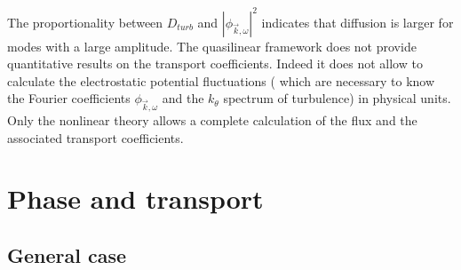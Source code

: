 The proportionality between $D_{turb}$ and $\left| \phi_{\vec{k},\omega} \right|^2$ indicates that diffusion is larger for modes with a large amplitude. The quasilinear framework does not provide quantitative results on the transport coefficients. Indeed it does not allow to calculate the electrostatic potential fluctuations ( which are necessary to know the Fourier coefficients $\phi_{\vec{k},\omega}$ and the $k_\theta$ spectrum of turbulence) in physical units. Only the nonlinear theory allows a complete calculation of the flux and the associated transport coefficients.



		\section{Phase and transport}
		\label{sec:DephasageEtTransport}
		
				\subsection{General case}
				\label{sub:DephasageCasGeneral}
				

